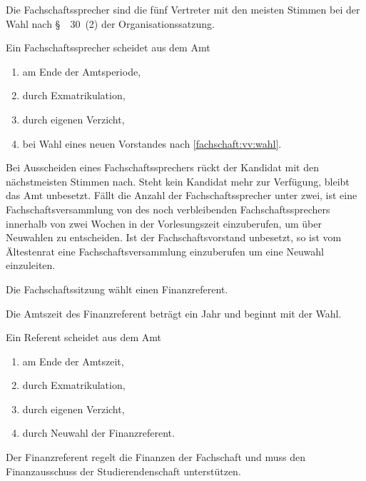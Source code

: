 \documentclass[a4paper,parskip=half,numbers=noenddot]{scrartcl}
\begin{document}
\begin{contract}
\label{fs:sprecher}

Die Fachschaftssprecher sind die fünf Vertreter mit den meisten Stimmen bei der Wahl nach §~~30~(2) der Organisationssatzung.

Ein Fachschaftssprecher scheidet aus dem Amt
  \begin{enumerate}
  \item am Ende der Amtsperiode,
  \item durch Exmatrikulation,
  \item durch eigenen Verzicht,
  \item bei Wahl eines neuen Vorstandes nach \ref{fachschaft:vv:wahl}.
\end{enumerate}

Bei Ausscheiden eines Fach\-schaftssprechers rückt der Kandidat mit den nächstmeisten Stimmen nach. Steht kein Kandidat mehr zur Verfügung, bleibt das Amt unbesetzt. Fällt die Anzahl der Fachschaftssprecher unter zwei, ist eine Fachschaftsversammlung von des noch verbleibenden Fachschaftssprechers innerhalb von zwei Wochen in der Vorlesungszeit einzuberufen, um über Neuwahlen zu entscheiden. Ist der Fachschaftsvorstand unbesetzt, so ist vom Ältestenrat eine Fachschaftsversammlung einzuberufen um eine Neuwahl einzuleiten.





%
%



Die Fachschaftssitzung wählt einen Finanzreferent.

Die Amtszeit des Finanzreferent beträgt ein Jahr und beginnt mit der Wahl.

Ein Referent scheidet aus dem Amt
\begin{enumerate}
\item am Ende der Amtszeit,
\item durch Exmatrikulation,
\item durch eigenen Verzicht,
\item durch Neuwahl der Finanzreferent.
\end{enumerate}

Der Finanzreferent regelt die Finanzen der Fachschaft und muss den Finanzausschuss der Studierendenschaft unterstützen.


\end{contract}
\end{document}
